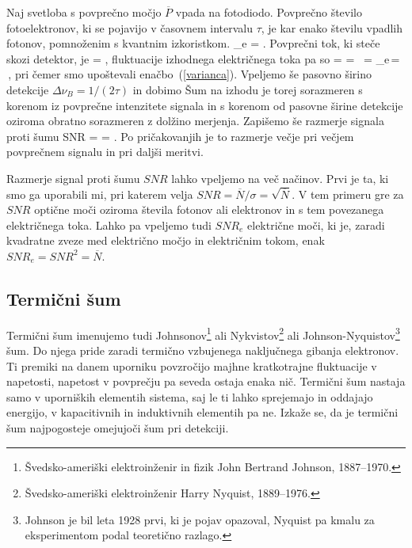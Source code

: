 Naj svetloba s povprečno močjo $\overline{P}$ vpada na fotodiodo.
Povprečno število fotoelektronov, ki se pojavijo v časovnem intervalu 
$\tau$, je kar enako številu vpadlih fotonov, pomnoženim 
s kvantnim izkoristkom. 
\beq
{}_e = \eta.
\eeq
Povprečni tok, ki steče skozi detektor, je  
\beq
{} = ,
\eeq
fluktuacije izhodnega električnega toka pa so
\beq
{}= = \,
 = _e\,= \,,
\eeq
pri čemer smo upoštevali enačbo~(\ref{varianca}). Vpeljemo še pasovno širino 
detekcije $\Delta\nu_B = 1/(2\tau)$ in dobimo
Šum na izhodu je torej sorazmeren s korenom iz povprečne intenzitete signala in 
s korenom od pasovne širine detekcije oziroma obratno sorazmeren z dolžino 
merjenja. Zapišemo še razmerje signala proti šumu 
\beq
SNR = = 
{}.
\eeq
Po pričakovanjih je to razmerje večje pri večjem povprečnem signalu in pri daljši meritvi.

\begin{remark}
Razmerje signal proti šumu $SNR$ lahko vpeljemo na več načinov. Prvi je ta, ki smo ga 
uporabili mi, pri katerem velja $SNR = \overline{N}/\sigma = \sqrt{\overline{N}}$. 
V tem primeru gre za $SNR$ optične moči oziroma števila fotonov ali elektronov in s 
tem povezanega električnega toka. Lahko pa vpeljemo tudi $SNR_e$ električne moči, ki je, 
zaradi kvadratne zveze med električno močjo in električnim tokom, enak $SNR_e=SNR^2=\overline{N}$.
\end{remark}

\subsection*{Termični šum} 
Termični šum imenujemo tudi Johnsonov\footnote{Švedsko-ameriški elektroinženir in fizik 
John Bertrand Johnson, 1887--1970.} ali Nykvistov\footnote{Švedsko-ameriški elektroinženir
Harry Nyquist, 1889--1976.} ali Johnson-Nyquistov\footnote{Johnson je bil leta 1928 prvi, 
ki je pojav opazoval, Nyquist pa kmalu za eksperimentom podal teoretično razlago.} šum. 
Do njega pride zaradi termično vzbujenega naključnega gibanja elektronov. Ti premiki
na danem uporniku povzročijo majhne kratkotrajne fluktuacije v napetosti, napetost
v povprečju pa seveda ostaja enaka nič.  
Termični šum nastaja samo v uporniških elementih sistema, saj le ti lahko
sprejemajo in oddajajo energijo, v kapacitivnih in induktivnih elementih pa ne.
Izkaže se, da je termični šum najpogosteje omejujoči šum pri detekciji.

